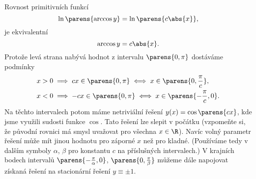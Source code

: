 \documentclass[answers]{exam}
\begin{document}
\begin{questions}
\begin{solution}
\begin{enumerate}[label=(\roman*)]
	  	Rovnost primitivních funkcí
	  	\begin{equation*}
	  		\ln \parens{\arccos y}
	  		=
	  		\ln \parens{c \abs{x}},
	  	\end{equation*}
	  	je ekvivalentní
	  	\begin{equation*}
	  		\arccos y
	  		=
	  		c \abs{x}.
	  	\end{equation*}
	  	Protože levá strana nabývá hodnot z intervalu $\parens{0, \pi}$ dostáváme podmínky
	  	\begin{align*}
	  		x > 0 &\implies c x \in \parens{0, \pi} \iff x \in \parens{0, \frac{\pi}{c}},
	  		\\
	  		x < 0 &\implies - c x \in \parens{0, \pi} \iff x \in \parens{-\frac{\pi}{c}, 0}.
	  	\end{align*}
	  	Na těchto intervalech potom máme netriviální řešení $y(x) = \cos\parens{cx}$, kde jsme využili sudosti funkce $\cos$. Tato řešení lze slepit v počátku (vzpomeňte si, že původní rovnici má smysl uvažovat pro všechna $x \in \R$). Navíc volný parametr řešení může mít jinou hodnotu pro záporné $x$ než pro kladné. (Používáme tedy v dalším symboly $\alpha$, $\beta$ pro konstantu $c$ na příslušných intervalech.) V krajních bodech intervalů $\parens{-\frac{\pi}{\alpha}, 0}$, $\parens{0, \frac{\pi}{\beta}}$ můžeme dále napojovat získaná řešení na stacionární řešení $y \equiv \pm1$.
	  	

\end{enumerate}
\end{solution}
\end{questions}
\end{document}
